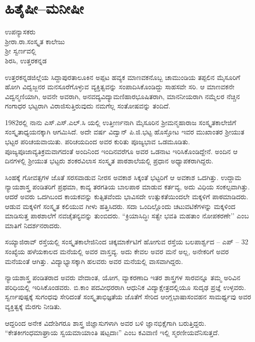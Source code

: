 \chapter{ಹಿತೈಷೀ–ಮನೀಷೀ}

\begin{center}
\smallskip

ಉಪನ್ಯಾಸಕರು\\ 
ಶ್ರೀರಾ.ರಾ.ಸಂಸ್ಕೃತ ಕಾಲೇಜು\\
ಶ್ರೀ ಸ್ವರ್ಣವಲ್ಲಿ\\
ಶಿರಸಿ, ಉತ್ತರಕನ್ನಡ
\addrule
\end{center}

ಉತ್ತರಕನ್ನಡಜಿಲ್ಲೆಯ ಸಿದ್ದಾಪುರತಾಲೂಕಿನ ಅಪ್ಪಟ ಹವ್ಯಕ ಮಾಣವಕನೊಬ್ಬ ಚಾಮುಂಡಿಯ ತಪ್ಪಲಿನ ಮೈಸೂರಿಗೆ ಹೋಗಿ ವಿದ್ವಜ್ಜನರ ಮನಸೂರೆಗೊಳ್ಳುವ ವ್ಯಕ್ತಿತ್ವವನ್ನು ಸಂಪಾದಿಸಿಕೊಂಡಿದ್ದು ಸಾಹಸವೇ ಸರಿ. ಆ ಮಾಣವಕನೇ ವಿದ್ವನ್ಮಣಿಯಾಗಿ, ಅವನೇ ಅವರಾಗಿ, ಅನವದ್ಯವಿದ್ಯಾಮಣಿಹಾರಭೂಷಿತರಾಗಿ, ಮಾನನೀಯರಾಗಿ ನಮ್ಮೆಲರ ನೆಚ್ಚಿನ ಗಂಗಾಧರ ಭಟ್ಟರಾಗಿ ವಿರಾಜಿಸುತ್ತಿರುವುದು ನಮಗೆಲ್ಲ ಸಂತೋಷವನ್ನು ತಂದಿದೆ.

1982ರಲ್ಲಿ ನಾನು  ಎಸ್.ಎಸ್.ಎಲ್.ಸಿ ಯಲ್ಲಿ ಉತ್ತೀರ್ಣನಾಗಿ ಮೈಸೂರಿನ ಶ್ರೀಮನ್ಮಹಾರಾಜ ಸಂಸ್ಕೃತಕಾಲೇಜಿಗೆ ಸಂಸ್ಕೃತಾಧ್ಯಯನಕ್ಕಾಗಿ ಆಗಮಿಸಿದೆ. ಅದೇ ವರ್ಷ ವಿದ್ವಾನ್ ಪಿ.ಜಿ.ಭಟ್ಟ ಹೊಸ್ತೋಟ ಇವರ ಮುಖಾಂತರ ಶ್ರೀಯುತ ಭಟ್ಟರ ಪರಿಚಯವಾಯಿತು. ಪರಿಚಯದಿಂದ ಅವರ ಕುರಿತು ಪೂಜ್ಯಭಾವ ಒಡಮೂಡಿತು. ಪೂಜ್ಯಪೂಜಾವ್ಯತಿಕ್ರಮವಾಗದಂತೆ ಅಂದಿನಿಂದ ಇಂದಿನವರೆಗೂ ಅವರ ಒಡನಾಟ ಇರಿಸಿಕೊಂಡಿದ್ದೇನೆ. ಅಂದಿನ ಆ ದಿನಗಳಲ್ಲಿ ಶ್ರೀಯುತ ಭಟ್ಟರು ಶಂಕರವಿಲಾಸ ಸಂಸ್ಕೃತ ಪಾಠಶಾಲೆಯಲ್ಲಿ ಪ್ರಧಾನ ಅಧ್ಯಾಪಕರಾಗಿದ್ದರು.

ಸಿಂಹಕ್ಕೆ ಗೋವತ್ಸಗಳ ಜೊತೆ ಸರಸವಾಡುವ ನೀರಸ ಅವಕಾಶ ಸಿಕ್ಕಂತೆ ಭಟ್ಟರಿಗೆ ಆ ಅವಕಾಶ ಒದಗಿತ್ತು. ಉದ್ದಾಮ ನ್ಯಾಯಶಾಸ್ತ್ರ ಪಂಡಿತರಿಗೆ ಪ್ರಥಮಾ, ಕಾವ್ಯ ತರಗತಿಯ ಬಾಲಪಾಠ ಮಾಡುವ ಕರ್ತವ್ಯ, ಅದು ವಿಧಿಯ ಸಂಕಲ್ಪವಾಗಿತ್ತು.  ಆದರೆ ಅವರು ಒದಗಿಬಂದ ಕಾಯಕವನ್ನು ಕುತ್ಸಿತವೆಂದು ಭಾವಿಸದೇ  ಉತ್ಸುಕತೆಯಿಂದಲೇ ಮಕ್ಕಳಿಗೆ ಪಾಠಮಾಡಿದರು. ಆಡುವ ಮಕ್ಕಳಿಗೆ ಸಂಸ್ಕೃತ ಕಲಿಯುವ ಗೀಳು ಹತ್ತಿಸಿದರು. ಸದಾ ಒಂದಿಲ್ಲೊಂದು ಚಟುವಟಿಕೆಗಳನ್ನು ಮಕ್ಕಳಿಂದ ಮಾಡಿಸುತ್ತ ಪಾಠಶಾಲೆಗೆ ನವಚೈತನ್ಯವನ್ನು ತುಂಬಿದರು. “ಕ್ರಿಯಾಸಿದ್ಧಿಃ ಸತ್ವೇ ಭವತಿ ಮಹತಾಂ ನೋಪಕರಣೇ’’ ಎಂಬ ಮಾತಿಗೆ ನಿದರ್ಶನರಾದರು.

ಸಯ್ಯಾಜಿರಾವ್ ರಸ್ತೆಯಲ್ಲಿ ಸಂಸ್ಕೃತಕಾಲೇಜಿನಿಂದ ಚಿಕ್ಕಮಾರ್ಕೆಟಿಗೆ ಹೋಗುವ ರಸ್ತೆಯ ಬಲಪಾರ್ಶ್ವದ – ಎಪ್ – 32 ಸಂಖ್ಯೆಯ ಹಳೆಯಕಾಲದ ಮನೆಯಲ್ಲಿ ಅವರ ವಾಸ್ತವ್ಯ. ಅದು ಕೇವಲ ಅವರ ಮನೆ ಅಲ್ಲ, ಅನೇಕರಿಗೆ ಅವರ ಮನೆಯಂತೆ ಆಗಿತ್ತು. ವಿದ್ಯಾಭ್ಯಾಸಕ್ಕಾಗಿ ಹಲವರು ಅವರ ಮನೆಯಲ್ಲಿ ವಾಸವಾಗಿದ್ದರು.

ನ್ಯಾಯಶಾಸ್ತ್ರ ಪಂಡಿತರಾದ ಅವರು ವೇದಾಂತ, ಯೋಗ, ವ್ಯಾಕರಣಾದಿ ಇತರ ಶಾಸ್ತ್ರಗಳ ಸಾರವನ್ನೂ ತಮ್ಮ ಅರಿವಿನ ಪರಿಧಿಯಲ್ಲಿ ಇರಿಸಿಕೊಂಡವರು. ಬಿ.ಕಾಂ ಪದವೀಧರರಾಗಿ ಆಧುನಿಕ ವಿದ್ಯಾಕ್ಷೇತ್ರದಲ್ಲಿಯೂ ಸುದೃಢ ಪ್ರಜ್ಞೆ ಉಳ್ಳವರು. ಸ್ವರ್ಣಪುಷ್ಪಕ್ಕೆ ಸುಗಂಧವು ಸೇರಿದಂತೆ ಸಂಸ್ಕೃತಾಭಿಜ್ಞತೆಯ ಜೊತೆಗೆ ಸೇರಿದ ಆಂಗ್ಲಭಾಷಾಸಂವಹನ ಸಾಮರ್ಥ್ಯವು ಅವರ ವ್ಯಕ್ತಿತ್ವಕ್ಕೆ ಮೆರಗು ನೀಡಿತು. 

ಆದ್ದರಿಂದ ಅನೇಕ ವಿದೇಶಿಗರೂ ಶಾಸ್ತ್ರ ಜಿಜ್ಞಾಸುಗಳಾಗಿ ಅವರ ಬಳಿ ಜ್ಞಾನಭಿಕ್ಷೆಗಾಗಿ ಬರುತ್ತಿದ್ದರು. “ಕೇತಕೀಗಂಧಮಾಘ್ರಾಯ ಸ್ವಯಮಾಯಾಂತಿ ಷಟ್ಪದಾಃ” ಎಂಬ ಕವಿವಾಣಿ ಇಲ್ಲಿ ಸ್ಮರಣೀಯವೆನಿಸುತ್ತದೆ.


